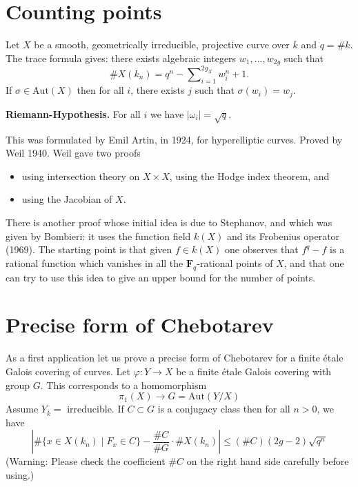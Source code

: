 \documentclass{stacks-project}
\theoremstyle{plain}
\theoremstyle{definition}
\theoremstyle{remark}
\numberwithin{equation}{subsection}
\begin{document}
\section{Counting points}
\label{section-counting}

\noindent
Let $X$ be a smooth, geometrically irreducible,
projective curve over $k$ and $q = \# k$. The trace formula gives:
there exists algebraic integers $w_1, \ldots, w_{2g}$ such that
$$
\# X(k_n) = q^n - \sum\nolimits_{i = 1}^{2g_X} w_i^n + 1.
$$
If $\sigma\in \text{Aut}(X)$ then for all $i$, there exists $j$ such that
$\sigma(w_i)=w_j$.

\medskip\noindent
{\bf Riemann-Hypothesis.} For all $i$ we have $|\omega_i| = \sqrt{q}$.

\medskip\noindent
This was formulated by Emil Artin, in 1924, for
hyperelliptic curves. Proved by Weil 1940. Weil gave two proofs
\begin{itemize}
\item using intersection theory on $X \times X$, using the
Hodge index theorem, and
\item using the Jacobian of $X$.
\end{itemize}
There is another proof whose initial idea is due to Stephanov, and
which was given by Bombieri: it uses the function field $k(X)$ and
its Frobenius operator (1969). The starting point is that given
$f\in k(X)$ one observes that $f^q - f$ is a rational function which
vanishes in all the $\mathbf{F}_q$-rational points of $X$, and that one
can try to use this idea to give an upper bound for the number of points.


\section{Precise form of Chebotarev}
\label{section-chebotarev}

\noindent
As a first application let us prove a precise form of Chebotarev
for a finite \'etale Galois covering of curves.
Let $\varphi : Y \to X$ be a finite \'etale Galois covering with
group $G$. This corresponds to a homomorphism
$$
\pi_1(X) \longrightarrow G = \text{Aut}(Y/X)
$$
Assume $Y_{\overline{k}} = $ irreducible. If $C\subset G$ is a conjugacy
class then for all $n > 0$, we have
$$
| \# \{x \in X(k_n) \mid F_x \in C\} - \frac{\# C}{\# G} \cdot \# X(k_n) |
\leq
(\# C)(2g - 2) \sqrt{q^n}
$$
(Warning: Please check the coefficient $\# C$ on the right hand side
carefully before using.)
\end{document}
